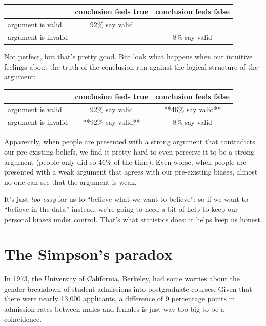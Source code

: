 \documentclass[
  11pt,
  a4paper,
  twoside,symmetric,openright]{book}
\theoremstyle{break}
\theoremstyle{break}
\begin{document}
\begin{table}[H]
\centering
\begin{tabular}{lcc}
\toprule
  & conclusion feels true & conclusion feels false\\
\midrule
argument is valid & 92\% say valid & \\
argument is invalid &  & 8\% say valid\\
\bottomrule
\end{tabular}
\end{table}

Not perfect, but that's pretty good. But look what happens when our intuitive feelings about the truth of the conclusion run against the logical structure of the argument:

\begin{table}[H]
\centering
\begin{tabular}{lcc}
\toprule
  & conclusion feels true & conclusion feels false\\
\midrule
argument is valid & 92\% say valid & **46\% say valid**\\
argument is invalid & **92\% say valid** & 8\% say valid\\
\bottomrule
\end{tabular}
\end{table}

Apparently, when people are presented with a strong argument that contradicts our pre-existing beliefs, we find it pretty hard to even perceive it to be a strong argument (people only did so 46\% of the time). Even worse, when people are presented with a weak argument that agrees with our pre-existing biases, almost no-one can see that the argument is weak.

It's just \emph{too easy} for us to ``believe what we want to believe''; so if we want to ``believe in the data'' instead, we're going to need a bit of help to keep our personal biases under control. That's what statistics does: it helps keep us honest.

\pagebreak[3]

\hypertarget{the-simpsons-paradox}{%
\section{The Simpson's paradox}\label{the-simpsons-paradox}}

In 1973, the University of California, Berkeley, had some worries about the gender breakdown of student admissions into postgraduate courses. Given that there were nearly 13,000 applicants, a difference of 9 percentage points in admission rates between males and females is just way too big to be a coincidence.
\end{document}

